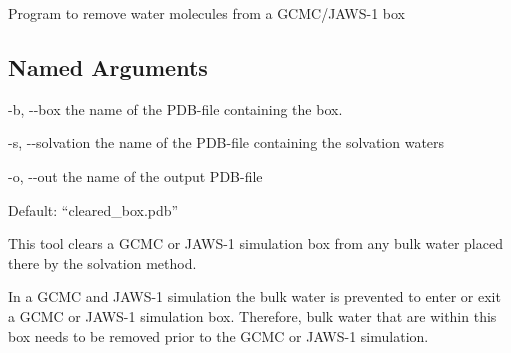 \documentclass[letterpaper,10pt,english]{sphinxmanual}
\begin{document}
Program to remove water molecules from a GCMC/JAWS-1 box


%
\begin{sphinxVerbatim}[commandchars=\\\{\}]
  \PYG{p}{[}\PYG{p}{]} \PYG{p}{[} \PYG{p}{]} \PYG{p}{[} \PYG{p}{]} \PYG{p}{[} \PYG{p}{]}
\end{sphinxVerbatim}


\subsection{Named Arguments}
\label{\detokenize{tools:Named Arguments}}\begin{optionlist}{3cm}
\item [-b, -{-}box]  
the name of the PDB-file containing the box.
\item [-s, -{-}solvation]  
the name of the PDB-file containing the solvation waters
\item [-o, -{-}out]  
the name of the output PDB-file

Default: “cleared\_box.pdb”
\end{optionlist}


%
\begin{sphinxVerbatim}[commandchars=\\\{\}]
    
      
\end{sphinxVerbatim}


This tool clears a GCMC or JAWS-1 simulation box from any bulk water placed there by the solvation method.

In a GCMC and JAWS-1 simulation the bulk water is prevented to enter or exit a GCMC or JAWS-1 simulation box. Therefore, bulk water that are within this box needs to be removed prior to the GCMC or JAWS-1 simulation.
\end{document}
